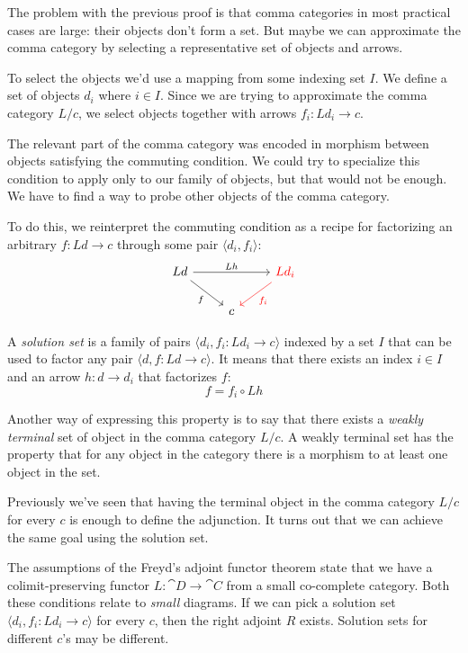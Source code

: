 \documentclass[DaoFP]{subfiles}
\begin{document}
The problem with the previous proof is that comma categories in most practical cases are large: their objects don't form a set. But maybe we can approximate the comma category by selecting a representative set of objects and arrows. 

To select the objects we'd use a mapping from some indexing set $I$. We define a set of objects $d_i$ where $i \in I$. Since we are trying to approximate the comma category $L/c$, we select objects together with arrows $f_i \colon L d_i \to c$. 

The relevant part of the comma category was encoded in morphism between objects satisfying the commuting condition. We could try to specialize this condition  to apply only to our family of objects, but that would not be enough. We have to find a way to probe other objects of the comma category. 

To do this, we reinterpret the commuting condition as a recipe for factorizing an arbitrary $f \colon L d \to c$ through some pair $\langle d_i, f_i \rangle$:
\[
 \begin{tikzcd}
 L d
 \arrow[rd, "f"']
 \arrow[rr, "L h"]
 && \textcolor{red}{L d_i}
 \arrow[ld, red, "f_i"]
 \\
 &c
  \end{tikzcd}
\]

A \emph{solution set} is a family of pairs $\langle d_i, f_i \colon L d_i \to c \rangle $ indexed by a set $I$ that can be used to factor any pair $\langle d, f \colon L d \to c \rangle $. It means that there exists an index $i \in I$ and an arrow $h \colon d \to d_i$ that factorizes $f$:
\[ f = f_i \circ L h \]

Another way of expressing this property is to say that there exists a \emph{weakly terminal} set of object in the comma category $L/c$. A weakly terminal set has the property that for any object in the category there is a morphism to at least one object in the set.

Previously we've seen that having the terminal object in the comma category $L/c$ for every $c$ is enough to define the adjunction. It turns out that we can achieve the same goal using the solution set. 

The assumptions of the Freyd's adjoint functor theorem state that we have a colimit-preserving functor $L \colon \cat D \to \cat C$ from a small co-complete category. Both these conditions relate to \emph{small} diagrams. If we can pick a solution set $\langle d_i, f_i \colon L d_i \to c \rangle $ for every $c$, then the right adjoint $R$ exists. Solution sets for different $c$'s may be different.
\end{document}
